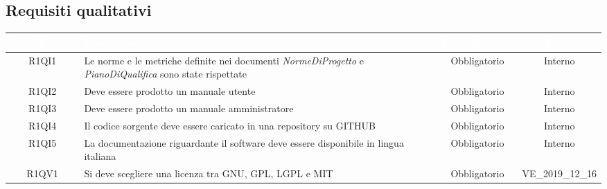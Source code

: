\subsection{Requisiti qualitativi}
{
\renewcommand{\arraystretch}{1.5}
\centering
\begin{longtable}{ c C{8cm} c c}
\textcolor{white}{\textbf{Identificativo}} & \textcolor{white}{\textbf{Descrizione}} & \textcolor{white}{\textbf{Classificazione}} & \textcolor{white}{\textbf{Fonti}}\\	
\endhead

R1QI1 & Le norme e le metriche definite nei documenti \textit{NormeDiProgetto} e \textit{PianoDiQualifica} sono state rispettate & Obbligatorio & Interno\\

R1QI2 & Deve essere prodotto un manuale utente & Obbligatorio & Interno\\

R1QI3 & Deve essere prodotto un manuale amministratore & Obbligatorio & Interno\\

R1QI4 & Il codice sorgente deve essere caricato in una repository su GITHUB & Obbligatorio & Interno\\

R1QI5 & La documentazione riguardante il software deve essere disponibile in lingua italiana & Obbligatorio & Interno\\

R1QV1 & Si deve scegliere una licenza tra GNU, GPL, LGPL e MIT& Obbligatorio & VE\_2019\_12\_16 \\

\end{longtable}
}